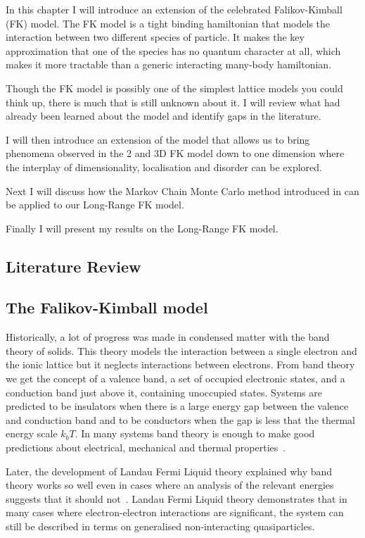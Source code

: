 In this chapter I will introduce an extension of the celebrated Falikov-Kimball (FK) model. The FK model is a tight binding hamiltonian that models the interaction between two different species of particle. It makes the key approximation that one of the species has no quantum character at all, which makes it more tractable than a generic interacting many-body hamiltonian.

Though the FK model is possibly one of the simplest lattice models you could think up, there is much that is still unknown about it. I will review what had already been learned about the model and identify gaps in the literature.

I will then introduce an extension of the model that allows us to bring phenomena observed in the 2 and 3D FK model down to one dimension where the interplay of dimensionality, localisation and disorder can be explored.

Next I will discuss how the Markov Chain Monte Carlo method introduced in can be applied to our Long-Range FK model.

Finally I will present my results on the Long-Range FK model.

\hypertarget{literature-review}{%
\subsection{Literature Review}\label{literature-review}}

\hypertarget{the-falikov-kimball-model-1}{%
\subsection{The Falikov-Kimball model}\label{the-falikov-kimball-model-1}}

Historically, a lot of progress was made in condensed matter with the band theory of solids. This theory models the interaction between a single electron and the ionic lattice but it neglects interactions between electrons. From band theory we get the concept of a valence band, a set of occupied electronic states, and a conduction band just above it, containing unoccupied states. Systems are predicted to be insulators when there is a large energy gap between the valence and conduction band and to be conductors when the gap is less that the thermal energy scale \(k_bT\). In many systems band theory is enough to make good predictions about electrical, mechanical and thermal properties~\autocite{ashcroftSolidStatePhysics1976}.

Later, the development of Landau Fermi Liquid theory explained why band theory works so well even in cases where an analysis of the relevant energies suggests that it should not~\autocite{wenQuantumFieldTheory2007}. Landau Fermi Liquid theory demonstrates that in many cases where electron-electron interactions are significant, the system can still be described in terms on generalised non-interacting quasiparticles.

